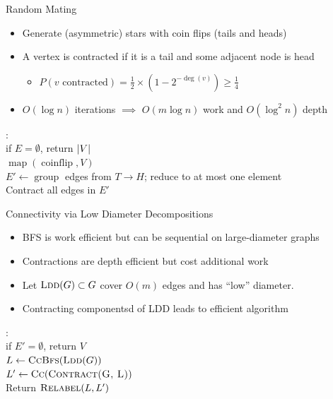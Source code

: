 \documentclass[aspectratio=169]{beamer}
\newcommand{\pauseitem}{\onslide<+-> \item}
\DeclareMathOperator{\pmap}{map}
\DeclareMathOperator{\pgroup}{group}
\begin{document}
\begin{frame}{Random Mating}
    \begin{itemize}
        \pauseitem Generate (asymmetric) stars with coin flips (tails and heads)
        \pauseitem A vertex is contracted if it is a tail and some adjacent node is head
        \begin{itemize}
            \pauseitem $P(v \text{ contracted}) = \frac{1}{2} \times (1 - 2^{-\deg(v)}) \ge \frac{1}{4}$
        \end{itemize}
        \pauseitem $O(\log n)$ iterations $\implies$ $O(m \log n)$ work and $O(\log^2 n)$ depth
    \end{itemize}

    \onslide<+->
    \vspace{\baselineskip}
    \begin{algo}
        : \+
        \\ if $E = \emptyset$, return $\abs{V}$
        \\ $\pmap(\operatorname{coinflip}, V)$
        \\ $E' \gets \pgroup$ edges from $T \to H$; reduce to at most one element
        \\ Contract all edges in $E'$
    \end{algo}
\end{frame}

\begin{frame}{Connectivity via Low Diameter Decompositions}
    \begin{itemize}
        \pauseitem BFS is work efficient but can be sequential on large-diameter graphs
        \pauseitem Contractions are depth efficient but cost additional work
        \pauseitem Let $\textsc{Ldd}(G) \subset G$ cover $O(m)$ edges and has ``low'' diameter.
        \pauseitem Contracting componentsd of LDD leads to efficient algorithm 
    \end{itemize}

    \vspace{\baselineskip}
    \begin{algo}
        : \+
        \\ if $E' = \emptyset$, return $V$
        \\ $L \gets \textsc{CcBfs}(\textsc{Ldd}(G))$
        \\ $L' \gets \textsc{Cc}(\textsc{Contract(G, L)})$
        \\ Return $\textsc{Relabel}(L, L')$
    \end{algo}
\end{frame}
\end{document}
